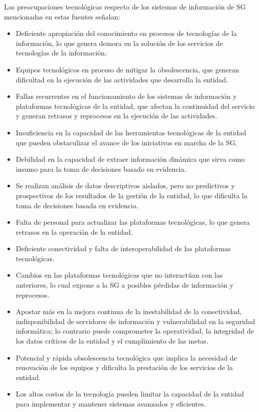 \documentclass[
	a4paper, %
	12pt, %
]{include/CSSullivanBusinessReport}
\def\tightlist{}
\begin{document}
Las preocupaciones tecnológicas respecto de los sistemas de información
de SG mencionadas en estas fuentes señalan:

\begin{itemize}
\tightlist
\item
  Deficiente apropiación del conocimiento en procesos de tecnologías de
  la información, lo que genera demora en la solución de los servicios
  de tecnologías de la información.
\item
  Equipos tecnológicos en proceso de mitigar la obsolescencia, que
  generan dificultad en la ejecución de las actividades que desarrolla
  la entidad.
\item
  Fallas recurrentes en el funcionamiento de los sistemas de información
  y plataformas tecnológicas de la entidad, que afectan la continuidad
  del servicio y generan retrasos y reprocesos en la ejecución de las
  actividades.
\item
  Insuficiencia en la capacidad de las herramientas tecnológicas de la
  entidad que pueden obstaculizar el avance de los iniciativas en marcha
  de la SG.
\item
  Debilidad en la capacidad de extraer información dinámica que sirva
  como insumo para la toma de decisiones basado en evidencia.
\item
  Se realizan análisis de datos descriptivos aislados, pero no
  predictivos y prospectivos de los resultados de la gestión de la
  entidad, lo que dificulta la toma de decisiones basada en evidencia.
\item
  Falta de personal para actualizar las plataformas tecnológicas, lo que
  genera retrasos en la operación de la entidad.
\item
  Deficiente conectividad y falta de interoperabilidad de las
  plataformas tecnológicas.
\item
  Cambios en las plataformas tecnológicas que no interactúan con las
  anteriores, lo cual expone a la SG a posibles pérdidas de información
  y reprocesos.
\item
  Apostar más en la mejora continua de la inestabilidad de la
  conectividad, indisponibilidad de servidores de información y
  vulnerabilidad en la seguridad informática; lo contrario puede
  comprometer la operatividad, la integridad de los datos críticos de la
  entidad y el cumplimiento de las metas.
\item
  Potencial y rápida obsolescencia tecnológica que implica la necesidad
  de renovación de los equipos y dificulta la prestación de los
  servicios de la entidad.
\item
  Los altos costos de la tecnología pueden limitar la capacidad de la
  entidad para implementar y mantener sistemas avanzados y eficientes.
\end{itemize}
\end{document}
